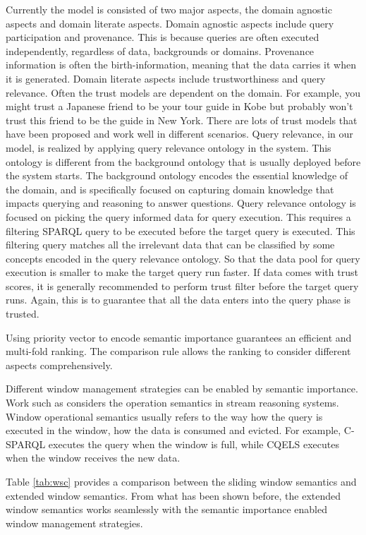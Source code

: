 Currently the model is consisted of two major aspects, the domain agnostic aspects and domain literate aspects. 
Domain agnostic aspects include query participation and provenance.
This is because queries are often executed independently, regardless of data, backgrounds or domains. 
Provenance information is often the birth-information, meaning that the data carries it when it is generated. 
Domain literate aspects include trustworthiness and query relevance.
Often the trust models are dependent on the domain. 
For example, you might trust a Japanese friend to be your tour guide in Kobe but probably won't trust this friend to be the guide in New York.
There are lots of trust models that have been proposed and work well in different scenarios. 
Query relevance, in our model, is realized by applying query relevance ontology in the system. 
This ontology is different from the background ontology that is usually deployed before the system starts.
The background ontology encodes the essential knowledge of the domain, and is specifically focused on capturing domain knowledge that impacts querying and reasoning to answer questions. 
Query relevance ontology is focused on picking the query informed data for query execution. 
This requires a filtering SPARQL query to be executed before the target query is executed.
This filtering query matches all the irrelevant data that can be classified by some concepts encoded in the query relevance ontology. 
So that the data pool for query execution is smaller to make the target query run faster. 
If data comes with trust scores, it is generally recommended to perform trust filter before the target query runs. 
Again, this is to guarantee that all the data enters into the query phase is trusted.

Using priority vector to encode semantic importance guarantees an efficient and multi-fold ranking.
The comparison rule allows the ranking to consider different aspects comprehensively.

Different window management strategies can be enabled by semantic importance. 
Work such as \cite{dell2013correctness} considers the operation semantics in stream reasoning systems. 
Window operational semantics usually refers to the way how the query is executed in the window, how the data is consumed and evicted. 
For example, C-SPARQL executes the query when the window is full, while CQELS executes when the window receives the new data.

Table \ref{tab:wsc} provides a comparison between the sliding window semantics and extended window semantics.
From what has been shown before, the extended window semantics works seamlessly with the semantic importance enabled window management strategies. 
%